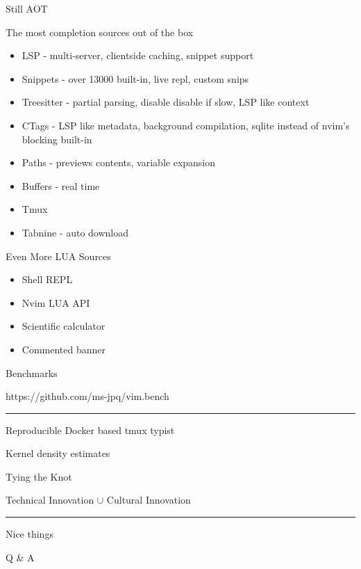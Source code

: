 \documentclass{beamer}
\begin{document}
\begin{frame}{Still AOT}

	The most completion sources out of the box

	\begin{itemize}

		\item LSP - multi-server, clientside caching, snippet support

		\item Snippets - over 13000 built-in, live repl, custom snips

		\item Treesitter - partial parsing, disable disable if slow, LSP like context

		\item CTags - LSP like metadata, background compilation, sqlite instead of nvim's blocking built-in

		\item Paths - previews contents, variable expansion

		\item Buffers - real time

		\item Tmux

		\item Tabnine - auto download

	\end{itemize}

\end{frame}


\begin{frame}{Even More LUA Sources}

	\begin{itemize}

		\item Shell REPL

		\item Nvim LUA API

		\item Scientific calculator

		\item Commented banner

	\end{itemize}

\end{frame}


\begin{frame}{Benchmarks}

	https://github.com/ms-jpq/vim.bench

	\rule{\textwidth}{0.1em}

	Reproducible Docker based tmux typist

	Kernel density estimates

\end{frame}


\begin{frame}{Tying the Knot}

	\centering

	\Large{Technical Innovation $\cup$ Cultural Innovation}

	\rule{\textwidth}{0.1em}

	Nice things

\end{frame}


\begin{frame}[standout]

	Q \& A

\end{frame}
\end{document}
